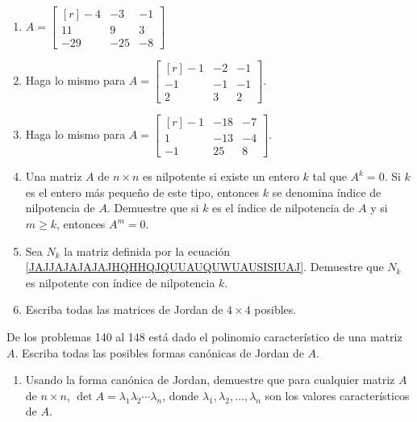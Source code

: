 \begin{enumerate}[start=134]
    \item $A=\begin{bmatrix*}[r]-4 & -3 & -1 \\ 11 & 9 & 3 \\ -29 & -25 & -8\end{bmatrix*}$
    \item Haga lo mismo para $A=\begin{bmatrix*}[r]-1 & -2 & -1 \\ -1 & -1 & -1 \\ 2 & 3 & 2\end{bmatrix*}$.
    \item Haga lo mismo para $A=\begin{bmatrix*}[r]-1 & -18 & -7 \\ 1 & -13 & -4 \\ -1 & 25 & 8\end{bmatrix*}$.
    \item Una matriz $A$ de $n \times n$ es nilpotente si existe un entero $k$ tal que $A^{k}=0$. Si $k$ es el entero más pequeño de este tipo, entonces $k$ se denomina índice de nilpotencia de $A$. Demuestre que si $k$ es el índice de nilpotencia de $A$ y si $m \geq k$, entonces $A^{m}=0$.
    \item Sea $N_{k}$ la matriz definida por la ecuación \eqref{JAJJAJAJAJAJHQHHQJQUUAUQUWUAUSISIUAJ}. Demuestre que $N_{k}$ es nilpotente con índice de nilpotencia $k$.
    \item Escriba todas las matrices de Jordan de $4 \times 4$ posibles.
\end{enumerate}
De los problemas 140 al 148 está dado el polinomio característico de una matriz $A$. Escriba todas las posibles formas canónicas de Jordan de $A$.
\begin{multienumerate}
    \setcounter{multienumi}{139}
\end{multienumerate}
\begin{enumerate}[start=149]
    \item Usando la forma canónica de Jordan, demuestre que para cualquier matriz $A$ de $n \times n$, $\operatorname{det} A=\lambda_{1} \lambda_{2} \cdots \lambda_{n}$, donde $\lambda_{1}, \lambda_{2}, \dots, \lambda_{n}$ son los valores característicos de $A$.
\end{enumerate}